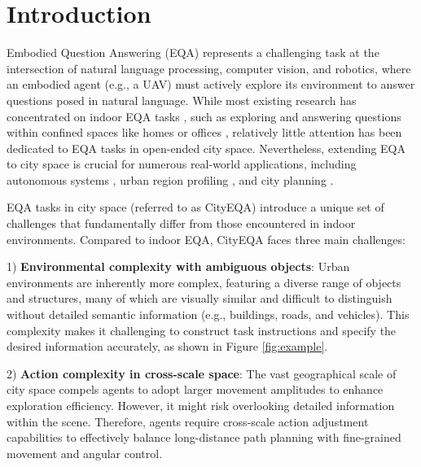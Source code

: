 \section{Introduction}
\label{sec::intro}

Embodied Question Answering (EQA) \cite{das2018embodied} represents a challenging task at the intersection of natural language processing, computer vision, and robotics, where an embodied agent (e.g., a UAV) must actively explore its environment to answer questions posed in natural language. While most existing research has concentrated on indoor EQA tasks \cite{gao2023room, pena2023visual}, such as exploring and answering questions within confined spaces like homes or offices \cite{liu2024aligning}, relatively little attention has been dedicated to EQA tasks in  open-ended city space. Nevertheless, extending EQA to city space is crucial for numerous real-world applications, including autonomous systems \cite{kalinowska2023embodied}, urban region profiling \cite{yan2024urbanclip}, and city planning \cite{gao2024embodiedcity}. 

EQA tasks in city space (referred to as CityEQA) introduce a unique set of challenges that fundamentally differ from those encountered in indoor environments. Compared to indoor EQA, CityEQA faces three main challenges: 

1) \textbf{Environmental complexity with ambiguous objects}: 
Urban environments are inherently more complex,  featuring a diverse range of objects and structures, many of which are visually similar and difficult to distinguish without detailed semantic information (e.g., buildings, roads, and vehicles). This complexity makes it challenging to construct task instructions and specify the desired information accurately, as shown in Figure \ref{fig:example}. 

2) \textbf{Action complexity in cross-scale space}: 
The vast geographical scale of city space compels agents to adopt larger movement amplitudes to enhance exploration efficiency. However, it might risk overlooking detailed information within the scene. Therefore, agents require cross-scale action adjustment capabilities to effectively balance long-distance path planning with fine-grained movement and angular control.

